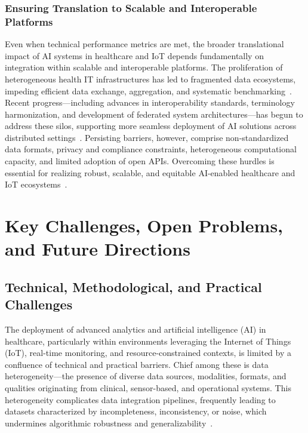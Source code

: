 \subsubsection{Ensuring Translation to Scalable and Interoperable Platforms}

Even when technical performance metrics are met, the broader translational impact of AI systems in healthcare and IoT depends fundamentally on integration within scalable and interoperable platforms. The proliferation of heterogeneous health IT infrastructures has led to fragmented data ecosystems, impeding efficient data exchange, aggregation, and systematic benchmarking~\cite{ref33,ref35,ref46,ref65}. Recent progress—including advances in interoperability standards, terminology harmonization, and development of federated system architectures—has begun to address these silos, supporting more seamless deployment of AI solutions across distributed settings~\cite{ref35,ref46,ref47}. Persisting barriers, however, comprise non-standardized data formats, privacy and compliance constraints, heterogeneous computational capacity, and limited adoption of open APIs. Overcoming these hurdles is essential for realizing robust, scalable, and equitable AI-enabled healthcare and IoT ecosystems~\cite{ref34,ref65}.

\section{Key Challenges, Open Problems, and Future Directions}

\subsection{Technical, Methodological, and Practical Challenges}

The deployment of advanced analytics and artificial intelligence (AI) in healthcare, particularly within environments leveraging the Internet of Things (IoT), real-time monitoring, and resource-constrained contexts, is limited by a confluence of technical and practical barriers. Chief among these is data heterogeneity—the presence of diverse data sources, modalities, formats, and qualities originating from clinical, sensor-based, and operational systems. This heterogeneity complicates data integration pipelines, frequently leading to datasets characterized by incompleteness, inconsistency, or noise, which undermines algorithmic robustness and generalizability~\cite{ref16,ref18,ref25,ref28,ref29,ref30,ref31,ref33,ref34,ref36,ref37,ref45,ref46,ref49,ref50,ref53,ref54,ref55,ref51,ref56,ref57,ref58,ref59,ref60,ref61,ref65,ref66,ref67,ref68,ref70,ref71,ref72,ref73,ref74,ref75,ref76,ref78,ref82,ref83,ref84,ref89,ref90,ref98,ref101,ref102,ref103,ref104,ref105,ref106,ref107}.

